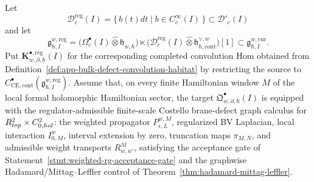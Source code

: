 \begin{prop}
\label{prop:app-regular-density-costello-graph-kernel}
  Let
  \[
    \mathcal D^{\mathrm{reg}}_c(I)
      =\{\,b(t)dt\mid b\in C^\infty_c(I)\,\}
      \subset \mathcal D'_c(I)
  \]
  and let
  \[
    \mathfrak g^{w,\mathrm{reg}}_{\hbar,I}
      =
      \bigl(\Omega^\bullet_c(I)\widehat\otimes
      \mathfrak h_{w,\hbar}\bigr)
      \ltimes
      \bigl(\mathcal D^{\mathrm{reg}}_c(I)\widehat\otimes
      \mathfrak h^{\vee,w}_{\hbar,\mathrm{cont}}\bigr)[1]
      \subset
      \mathfrak g^{w,\mathrm{cur}}_{\hbar,I}.
  \]
  Put \(\mathbf K^{\bullet,\mathrm{reg}}_{w,\partial,\hbar}(I)\) for the
  corresponding completed convolution Hom obtained from
  Definition~\ref{def:app-bulk-defect-convolution-habitat} by restricting
  the source to
  \(C^\bullet_{\mathrm{CE},\mathrm{cont}}
  (\mathfrak g^{w,\mathrm{reg}}_{\hbar,I})\).
  Assume that, on every finite Hamiltonian window \(M\) of the local
  formal holomorphic Hamiltonian sector, the target
  \(\mathfrak Q^\bullet_{w,\partial,\hbar}(I)\) is equipped with the
  regulator-admissible finite-scale Costello brane-defect graph calculus
  for
  \(R^2_{top}\times C^2_{0,hol}\):
  the weighted propagator \(P_{\epsilon,L}^{w,M}\), regularized BV
  Laplacian, local interaction \(I_{0,M}^{w}\), interval extension by
  zero, truncation maps \(\pi_{M,N}\), and admissible weight transports
  \(R^M_{w,w'}\), satisfying the acceptance gate of
  Statement~\ref{stmt:weighted-rg-acceptance-gate} and the graphwise
  Hadamard/Mittag--Leffler control of
  Theorem~\ref{thm:hadamard-mittag-leffler}.


\end{prop}

